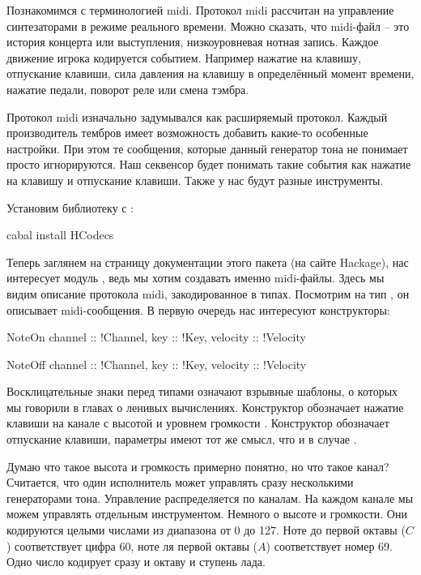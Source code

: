 Познакомимся с терминологией midi. Протокол midi рассчитан на управление
синтезаторами в режиме реального времени. Можно сказать, что midi-файл
-- это история концерта или выступления, низкоуровневая нотная запись.
Каждое движение игрока кодируется событием. Например нажатие на клавишу,
отпускание клавиши, сила давления на клавишу в определённый момент
времени, нажатие педали, поворот реле или смена тэмбра.

Протокол midi изначально задумывался как расширяемый протокол. Каждый
производитель тембров имеет возможность добавить какие-то особенные
настройки. При этом те сообщения, которые данный генератор тона не
понимает просто игнорируются. Наш секвенсор будет понимать такие события
как нажатие на клавишу и отпускание клавиши. Также у нас будут разные
инструменты.

Установим библиотеку  с :


\begin{code}
cabal install HCodecs
\end{code}

Теперь заглянем на страницу документации этого пакета (на сайте
Hackage), нас интересует модуль , ведь мы хотим создавать
именно midi-файлы. Здесь мы видим описание протокола midi,
закодированное в типах. Посмотрим на тип , он описывает
midi-сообщения. В первую очередь нас интересуют конструкторы:


\begin{code}
NoteOn {
    channel  :: !Channel,
    key      :: !Key,
    velocity :: !Velocity }

NoteOff	{
    channel  :: !Channel,
    key      :: !Key,
    velocity :: !Velocity }
\end{code}

Восклицательные знаки перед типами означают взрывные шаблоны, о которых
мы говорили в главах о ленивых вычислениях. Конструктор 
обозначает нажатие клавиши на канале  с высотой  и
уровнем громкости . Конструктор  обозначает
отпускание клавиши, параметры имеют тот же смысл, что и в случае
.

Думаю что такое высота и громкость примерно понятно, но что такое канал?
Считается, что один исполнитель может управлять сразу несколькими
генераторами тона. Управление распределяется по каналам. На каждом
канале мы можем управлять отдельным инструментом. Немного о высоте и
громкости. Они кодируются целыми числами из диапазона от 0 до 127. Ноте
до первой октавы ($C$) соответствует цифра 60, ноте ля первой октавы
($A$) соответствует номер 69. Одно число кодирует сразу и октаву и
ступень лада.

